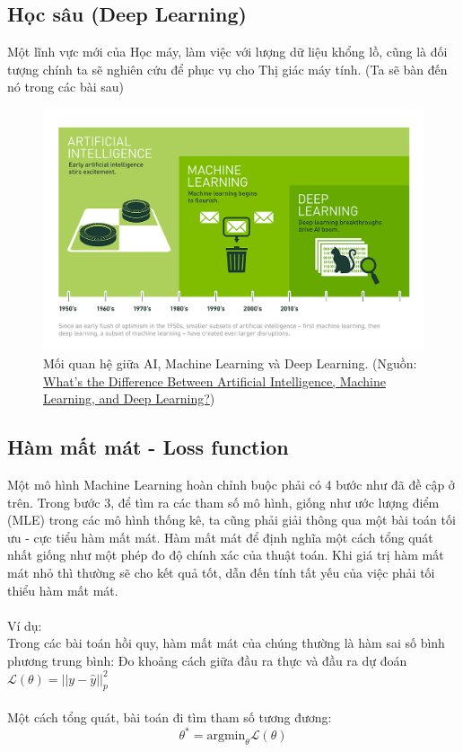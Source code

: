 \documentclass{article}
\begin{document}
\subsection*{Học sâu (Deep Learning)}
Một lĩnh vực mới của Học máy, làm việc với lượng dữ liệu khổng lồ, cũng là đối tượng chính ta sẽ nghiên cứu để phục vụ cho Thị giác máy tính. (Ta sẽ bàn đến nó trong các bài sau)

\begin{figure}[ht!]
    \centering
    \includegraphics[width = \linewidth]{ml_dl.png}
    \caption{Mối quan hệ giữa AI, Machine Learning và Deep Learning. (Nguồn: \href{https://blogs.nvidia.com/blog/2016/07/29/whats-difference-artificial-intelligence-machine-learning-deep-learning-ai/}{What’s the Difference Between Artificial Intelligence, Machine Learning, and Deep Learning?})}
    \label{fig1}
\end{figure}
\subsection*{Hàm mất mát - Loss function}
Một mô hình Machine Learning hoàn chỉnh buộc phải có 4 bước như đã đề cập ở trên. Trong bước 3, để tìm ra các tham số mô hình, giống như ước lượng điểm (MLE) trong các mô hình thống kê, ta cũng phải giải thông qua một bài toán tối ưu - cực tiểu hàm mất mát. Hàm mất mát để định nghĩa một cách tổng quát nhất giống như một phép đo độ chính xác của thuật toán. Khi giá trị hàm mất mát nhỏ thì thường sẽ cho kết quả tốt, dẫn đến tính tất yếu của việc phải tối thiểu hàm mất mát.\\\\
Ví dụ: \\Trong các bài toán hồi quy, hàm mất mát của chúng thường là hàm sai số bình phương trung bình: Đo khoảng cách giữa đầu ra thực và đầu ra dự đoán $\mathcal{L}(\theta) = ||y-\hat{y}||_{p}^{2}$ \label{n2}
\phantom{a}\\\\
Một cách tổng quát, bài toán đi tìm tham số tương đương:
\begin{equation}
    \theta^* = \text{argmin}_{\theta}\mathcal{L}(\theta)
\end{equation}
\end{document}

